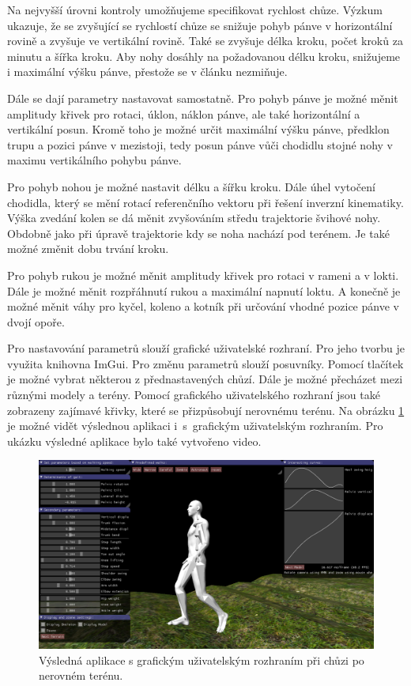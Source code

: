 Na nejvyšší úrovni kontroly umožňujeme specifikovat rychlost chůze. Výzkum \cite{orendurff2004effect} ukazuje, že se zvyšující se rychlostí chůze se snižuje pohyb pánve v horizontální rovině a zvyšuje ve vertikální rovině. Také se zvyšuje délka kroku, počet kroků za minutu a šířka kroku. Aby nohy dosáhly na požadovanou délku kroku, snižujeme i maximální výšku pánve, přestože se v článku nezmiňuje.

Dále se dají parametry nastavovat samostatně. Pro pohyb pánve je možné měnit amplitudy křivek pro rotaci, úklon, náklon pánve, ale také horizontální a vertikální posun. Kromě toho je možné určit maximální výšku pánve, předklon trupu a pozici pánve v mezistoji, tedy posun pánve vůči chodidlu stojné nohy v maximu vertikálního pohybu pánve. 

Pro pohyb nohou je možné nastavit délku a šířku kroku. Dále úhel vytočení chodidla, který se mění rotací referenčního vektoru při řešení inverzní kinematiky. Výška zvedání kolen se dá měnit zvyšováním středu trajektorie švihové nohy. Obdobně jako při úpravě trajektorie kdy se noha nachází pod terénem. Je také možné změnit dobu trvání kroku.

Pro pohyb rukou je možné měnit amplitudy křivek pro rotaci v rameni a v lokti. Dále je možné měnit rozpřáhnutí rukou a maximální napnutí loktu. A konečně je možné měnit váhy pro kyčel, koleno a kotník při určování vhodné pozice pánve v dvojí opoře.

Pro nastavování parametrů slouží grafické uživatelské rozhraní. Pro jeho tvorbu je využita knihovna ImGui. Pro změnu parametrů slouží posuvníky. Pomocí tlačítek je možné vybrat některou z přednastavených chůzí. Dále je možné přecházet mezi různými modely a terény. Pomocí grafického uživatelského rozhraní jsou také zobrazeny zajímavé křivky, které se přizpůsobují nerovnému terénu. Na obrázku \ref{fig:screen} je možné vidět výslednou aplikaci i~s~grafickým uživatelským rozhraním. Pro ukázku výsledné aplikace bylo také vytvořeno video\protect\footnotemark.


\begin{figure}[h]
	\centering
	\includegraphics[width=1.0\linewidth]{fig/screen.png}
	\caption{Výsledná aplikace s grafickým uživatelským rozhraním při chůzi po nerovném terénu.}
	\label{fig:screen}
\end{figure}

